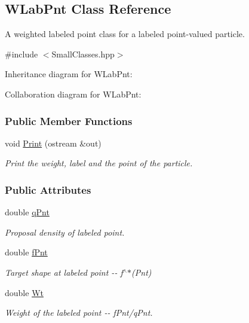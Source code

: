\hypertarget{classWLabPnt}{\subsection{\-W\-Lab\-Pnt \-Class \-Reference}
\label{classWLabPnt}
}


\-A weighted labeled point class for a labeled point-\/valued particle.  




{\ttfamily \#include $<$\-Small\-Classes.\-hpp$>$}



\-Inheritance diagram for \-W\-Lab\-Pnt\-:


\-Collaboration diagram for \-W\-Lab\-Pnt\-:
\subsubsection*{\-Public \-Member \-Functions}
\begin{DoxyCompactItemize}
\item 
void \hyperlink{classWLabPnt_a8c511a61a9524e2db1c3fa58b1d37293}{\-Print} (ostream \&out)
\begin{DoxyCompactList}\small\item\em \-Print the weight, label and the point of the particle. \end{DoxyCompactList}\end{DoxyCompactItemize}
\subsubsection*{\-Public \-Attributes}
\begin{DoxyCompactItemize}
\item 
double \hyperlink{classWLabPnt_a571c18b84ec2394bb517bee7b1a225f0}{q\-Pnt}
\begin{DoxyCompactList}\small\item\em \-Proposal density of labeled point. \end{DoxyCompactList}\item 
double \hyperlink{classWLabPnt_a5578d8ba94fa38860ea5b10527327ff3}{f\-Pnt}
\begin{DoxyCompactList}\small\item\em \-Target shape at labeled point -\/-\/ f$^\wedge$$\ast$(\-Pnt) \end{DoxyCompactList}\item 
double \hyperlink{classWLabPnt_a570ae2d3848d909ce95291f8d7ffc573}{\-Wt}
\begin{DoxyCompactList}\small\item\em \-Weight of the labeled point -\/-\/ f\-Pnt/q\-Pnt. \end{DoxyCompactList}\end{DoxyCompactItemize}


